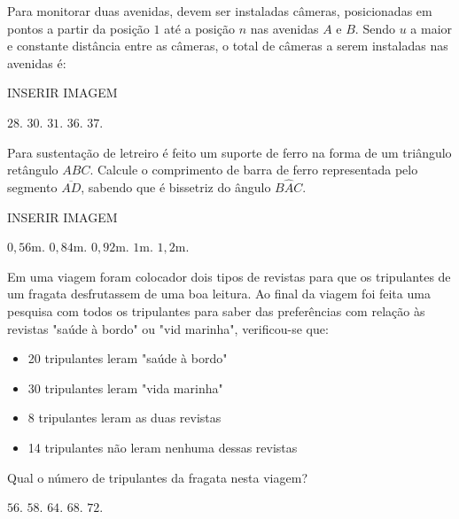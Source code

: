 \begin{question}%
Para monitorar duas avenidas, devem ser instaladas câmeras, posicionadas em pontos a partir da posição \(1\) até a posição \(n\) nas avenidas \(A\) e \(B\). Sendo \(u\) a maior e constante distância entre as câmeras, o total de câmeras a serem instaladas nas avenidas é:

INSERIR IMAGEM
    \begin{tasks}
        \task \(28\).
        \task \(30\).
        \task \(31\).
        \task \(36\).
        \task \(37\).
    \end{tasks}
\end{question}

\begin{question}%
Para sustentação de letreiro é feito um suporte de ferro na forma de um triângulo retângulo \(ABC\). Calcule o comprimento de barra de ferro representada pelo segmento \(\overline{AD}\), sabendo que é bissetriz do ângulo \(B\hat{A}C\).

INSERIR IMAGEM
    \begin{tasks}
        \task \(0,56\)m.
        \task \(0,84\)m.
        \task \(0,92\)m.
        \task \(1\)m.
        \task \(1,2\)m.
    \end{tasks}
\end{question}

\begin{question}%
Em uma viagem foram colocador dois tipos de revistas para que os tripulantes de um fragata desfrutassem de uma boa leitura. Ao final da viagem foi feita uma pesquisa com todos os tripulantes para saber das preferências com relação às revistas "saúde à bordo" ou "vid marinha", verificou-se que:

\begin{itemize}
    \item 20 tripulantes leram "saúde à bordo"
    \item 30 tripulantes leram "vida marinha"
    \item 8 tripulantes leram as duas revistas
    \item 14 tripulantes não leram nenhuma dessas revistas
\end{itemize}
Qual o número de tripulantes da fragata nesta viagem?
    \begin{tasks}
        \task \(56\).
        \task \(58\).
        \task \(64\).
        \task \(68\).
        \task \(72\).
    \end{tasks}
\end{question}


